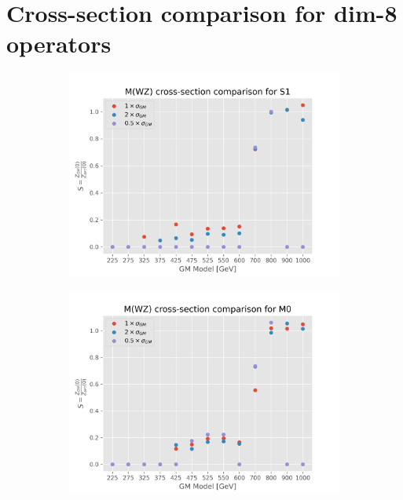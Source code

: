 \documentclass[../Bachelorarbeit.tex]{subfiles}
\begin{document}
\section{Cross-section comparison for dim-8 operators}
\begin{figure}[h]
    \centering
    \begin{subfigure}{0.45\textwidth}
        \includegraphics[width=\textwidth]{Plots/gm_relevanze/MWZ_comparision_S1.png}
        \caption{}
    \end{subfigure}
    \begin{subfigure}{0.45\textwidth}
        \includegraphics[width=\textwidth]{Plots/gm_relevanze/MWZ_comparision_M0.png}
        \caption{}
    \end{subfigure}

\end{figure}
\end{document}
